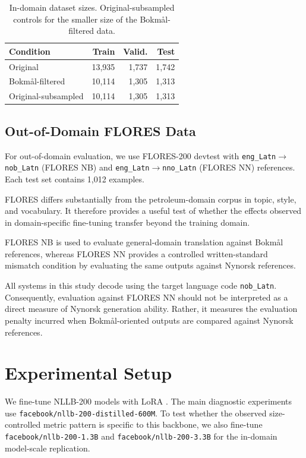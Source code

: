\documentclass[11pt]{article}
\newcommand{\nb}{Bokm{\aa}l}
\newcommand{\nn}{Nynorsk}
\begin{document}
\begin{table}[t]
\centering
\small
\begin{tabular}{lrrr}
\toprule
Condition & Train & Valid. & Test \\
\midrule
Original & 13,935 & 1,737 & 1,742 \\
\nb{}-filtered & 10,114 & 1,305 & 1,313 \\
Original-subsampled & 10,114 & 1,305 & 1,313 \\
\bottomrule
\end{tabular}
\caption{In-domain dataset sizes. Original-subsampled controls for the smaller size of the \nb{}-filtered data.}
\label{tab:data}
\end{table}

\subsection{Out-of-Domain FLORES Data}

For out-of-domain evaluation, we use FLORES-200 devtest with
\texttt{eng\_Latn}$\rightarrow$\texttt{nob\_Latn}
(FLORES NB) and
\texttt{eng\_Latn}$\rightarrow$\texttt{nno\_Latn}
(FLORES NN) references. Each test set contains 1,012 examples.

FLORES differs substantially from the petroleum-domain corpus in topic, style, and vocabulary. It therefore provides a useful test of whether the effects observed in domain-specific fine-tuning transfer beyond the training domain.

FLORES NB is used to evaluate general-domain translation against \nb{} references, whereas FLORES NN provides a controlled written-standard mismatch condition by evaluating the same outputs against \nn{} references.

All systems in this study decode using the target language code \texttt{nob\_Latn}. Consequently, evaluation against FLORES NN should not be interpreted as a direct measure of \nn{} generation ability. Rather, it measures the evaluation penalty incurred when \nb{}-oriented outputs are compared against \nn{} references.

\section{Experimental Setup}

We fine-tune NLLB-200 models \cite{nllbteam2024scaling} with LoRA \cite{hu2021lora}. The main diagnostic experiments use \texttt{facebook/nllb-200-distilled-600M}. To test whether the observed size-controlled metric pattern is specific to this backbone, we also fine-tune \texttt{facebook/nllb-200-1.3B} and \texttt{facebook/nllb-200-3.3B} for the in-domain model-scale replication.
\end{document}

